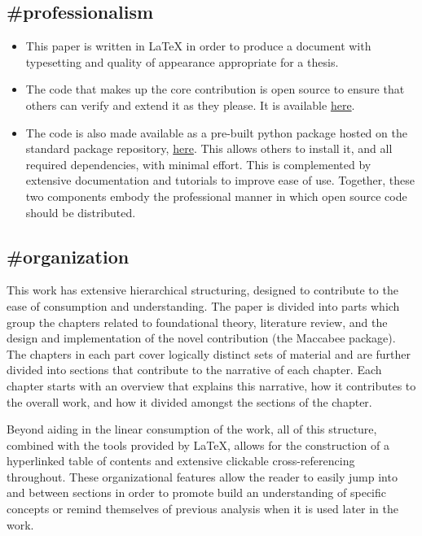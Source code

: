 \documentclass[./main.tex]{subfiles}
\begin{document}
\subsection*{\textbf{\#professionalism}}
\label{hc:professionalism}

\begin{itemize}
    \item This paper is written in \LaTeX \(  \) in order to produce a document with typesetting and quality of appearance appropriate for a thesis.
    
    \item The code that makes up the core contribution is open source to ensure that others can verify and extend it as they please. It is available \href{https://github.com/JoshBroomberg/Maccabee}{here}.
    
    \item The code is also made available as a pre-built python package hosted on the standard package repository, \href{https://pypi.org/project/maccabee/}{here}. This allows others to install it, and all required dependencies, with minimal effort. This is complemented by extensive documentation and tutorials to improve ease of use. Together, these two components embody the professional manner in which open source code should be distributed.
\end{itemize}


\subsection*{\textbf{\#organization}}
\label{hc:organization}

This work has extensive hierarchical structuring, designed to contribute to the ease of consumption and understanding. The paper is divided into parts which group the chapters related to foundational theory, literature review, and the design and implementation of the novel contribution (the Maccabee package). The chapters in each part cover logically distinct sets of material and are further divided into sections that contribute to the narrative of each chapter. Each chapter starts with an overview that explains this narrative, how it contributes to the overall work, and how it divided amongst the sections of the chapter.

\vspace{\baselineskip}

Beyond aiding in the linear consumption of the work, all of this structure, combined with the tools provided by \LaTeX, allows for the construction of a hyperlinked table of contents and extensive clickable cross-referencing throughout. These organizational features allow the reader to easily jump into and between sections in order to promote build an understanding of specific concepts or remind themselves of previous analysis when it is used later in the work.
\end{document}
